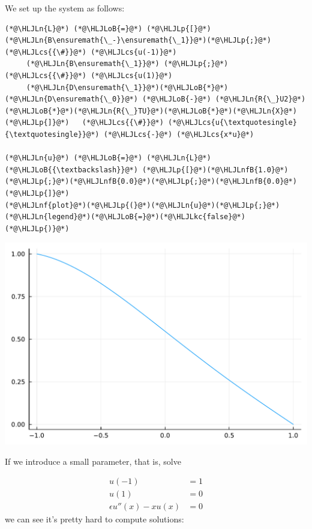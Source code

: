 \documentclass[12pt,a4paper]{article}
\newcommand{\HLJLkc}[1]{\textcolor[RGB]{59,151,46}{\textit{#1}}}
\newcommand{\HLJLn}[1]{#1}
\newcommand{\HLJLnf}[1]{\textcolor[RGB]{66,102,213}{#1}}
\newcommand{\HLJLnfB}[1]{\textcolor[RGB]{59,151,46}{#1}}
\newcommand{\HLJLoB}[1]{\textcolor[RGB]{102,102,102}{\textbf{#1}}}
\newcommand{\HLJLp}[1]{#1}
\newcommand{\HLJLcs}[1]{\textcolor[RGB]{153,153,119}{\textit{#1}}}
\begin{document}
We set up the system as follows:


\begin{lstlisting}
(*@\HLJLn{L}@*) (*@\HLJLoB{=}@*) (*@\HLJLp{[}@*)(*@\HLJLn{B\ensuremath{\_-}\ensuremath{\_1}}@*)(*@\HLJLp{;}@*)   (*@\HLJLcs{{\#}}@*) (*@\HLJLcs{u(-1)}@*)
     (*@\HLJLn{B\ensuremath{\_1}}@*) (*@\HLJLp{;}@*)   (*@\HLJLcs{{\#}}@*) (*@\HLJLcs{u(1)}@*)
     (*@\HLJLn{D\ensuremath{\_1}}@*)(*@\HLJLoB{*}@*)(*@\HLJLn{D\ensuremath{\_0}}@*) (*@\HLJLoB{-}@*) (*@\HLJLn{R{\_}U2}@*)(*@\HLJLoB{*}@*)(*@\HLJLn{R{\_}TU}@*)(*@\HLJLoB{*}@*)(*@\HLJLn{X}@*)(*@\HLJLp{]}@*)   (*@\HLJLcs{{\#}}@*) (*@\HLJLcs{u{\textquotesingle}{\textquotesingle}}@*) (*@\HLJLcs{-}@*) (*@\HLJLcs{x*u}@*)

(*@\HLJLn{u}@*) (*@\HLJLoB{=}@*) (*@\HLJLn{L}@*) (*@\HLJLoB{{\textbackslash}}@*) (*@\HLJLp{[}@*)(*@\HLJLnfB{1.0}@*)(*@\HLJLp{;}@*)(*@\HLJLnfB{0.0}@*)(*@\HLJLp{;}@*)(*@\HLJLnfB{0.0}@*)(*@\HLJLp{]}@*)
(*@\HLJLnf{plot}@*)(*@\HLJLp{(}@*)(*@\HLJLn{u}@*)(*@\HLJLp{;}@*) (*@\HLJLn{legend}@*)(*@\HLJLoB{=}@*)(*@\HLJLkc{false}@*)(*@\HLJLp{)}@*)
\end{lstlisting}

\includegraphics[width=\linewidth]{jl_hpkPoK/OP_methods_test_43_1.pdf}

If we introduce a small parameter, that is, solve


\begin{align*}
u(-1) &= 1\\
u(1) &= 0\\
\epsilon u''(x) - xu(x) &= 0
\end{align*}
we can see it's pretty hard to compute solutions:
\end{document}
